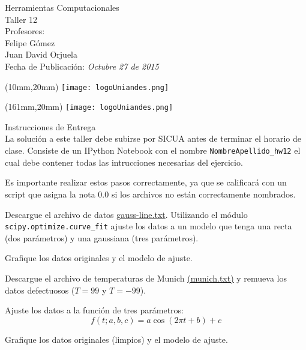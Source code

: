 \documentclass[11pt,letterpaper]{exam}
\begin{document}
\begin{center}
{\Large Herramientas Computacionales \\
 Taller 12}\\
Profesores: \\ Felipe G\'omez\\ Juan David Orjuela \\
Fecha de Publicación: {\small \it Octubre 27 de 2015}\\
\end{center}

\begin{textblock*}{40mm}(10mm,20mm)
  \texttt{[image: logoUniandes.png]}
\end{textblock*}

\begin{textblock*}{40mm}(161mm,20mm)
  \texttt{[image: logoUniandes.png]}
\end{textblock*}

\vspace{0.5cm}

{\Large Instrucciones de Entrega}\\

\noindent
La solución a este taller debe subirse por SICUA antes de terminar 
el horario de clase.
\noindent
Consiste de un IPython Notebook con el nombre
\verb"NombreApellido_hw12"
el cual debe contener todas las intrucciones necesarias del ejercicio.

Es importante realizar estos pasos correctamente, ya que se calificará con un
script que asigna la nota 0.0 si los archivos no están correctamente nombrados.

\begin{questions}


Descargue el archivo de datos 
\href{https://github.com/ComputoCienciasUniandes/HerramientasComputacionales/raw/master/Homeworks/2015-20/hw12/gauss_line.txt}{gauss-line.txt}.
Utilizando el módulo \verb|scipy.optimize.curve_fit| ajuste los datos a un modelo que 
tenga una recta (dos parámetros) y una gaussiana (tres parámetros).

Grafique los datos originales y el modelo de ajuste.




Descargue el archivo de temperaturas de Munich 
\href{http://www2.mpia-hd.mpg.de/~robitaille/PY4SCI_SS_2014/_static/data/munich_temperatures_average_with_bad_data.txt}{(munich.txt)} y
remueva los datos defectuosos ($T=99$ y $T =-99$).

Ajuste los datos a la función de tres parámetros:
$$ f(t; a,b,c) = a \cos\left( 2\pi t + b \right) + c $$

Grafique los datos originales (limpios) y el modelo de ajuste.


\end{questions}
\end{document}
